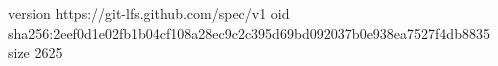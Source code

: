 version https://git-lfs.github.com/spec/v1
oid sha256:2eef0d1e02fb1b04cf108a28ec9c2c395d69bd092037b0e938ea7527f4db8835
size 2625
